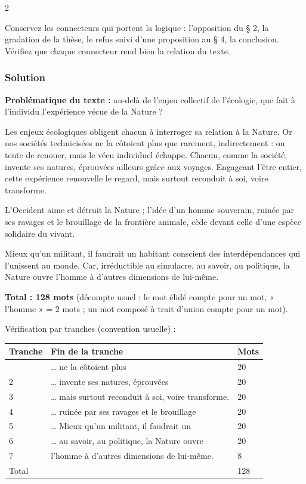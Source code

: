 \documentclass[11pt,a4paper]{article}
\begin{document}
\begin{indication}{2}

Conservez les connecteurs qui portent la logique : l'opposition du § 2, la gradation de la thèse, le refus suivi d'une proposition au § 4, la conclusion. Vérifiez que chaque connecteur rend bien la relation du texte.

\end{indication}

\hypertarget{solution-2}{%
\subsubsection{Solution}\label{solution-2}}

\textbf{Problématique du texte :} au-delà de l'enjeu collectif de l'écologie, que fait à l'individu l'expérience vécue de la Nature ?

Les enjeux écologiques obligent chacun à interroger sa relation à la Nature. Or nos sociétés technicisées ne la côtoient plus \textbar{} que rarement, indirectement : on tente de renouer, mais le vécu individuel échappe. Chacun, comme la société, invente ses natures, éprouvées \textbar{} ailleurs grâce aux voyages. Engageant l'être entier, cette expérience renouvelle le regard, mais surtout reconduit à soi, voire transforme. \textbar{}

L'Occident aime et détruit la Nature ; l'idée d'un homme souverain, ruinée par ses ravages et le brouillage \textbar{} de la frontière animale, cède devant celle d'une espèce solidaire du vivant.

Mieux qu'un militant, il faudrait un \textbar{} habitant conscient des interdépendances qui l'unissent au monde. Car, irréductible au simulacre, au savoir, au politique, la Nature ouvre \textbar{} l'homme à d'autres dimensions de lui-même.

\textbf{Total : 128 mots} (décompte usuel : le mot élidé compte pour un mot, « l'homme » = 2 mots ; un mot composé à trait d'union compte pour un mot).

Vérification par tranches (convention usuelle) :

\begin{longtable}[]{@{}lll@{}}
\toprule\noalign{}
Tranche & Fin de la tranche & Mots \\
\midrule\noalign{}
\endhead
\bottomrule\noalign{}
\endlastfoot
1 & \ldots{} ne la côtoient plus & 20 \\
2 & \ldots{} invente ses natures, éprouvées & 20 \\
3 & \ldots{} mais surtout reconduit à soi, voire transforme. & 20 \\
4 & \ldots{} ruinée par ses ravages et le brouillage & 20 \\
5 & \ldots{} Mieux qu'un militant, il faudrait un & 20 \\
6 & \ldots{} au savoir, au politique, la Nature ouvre & 20 \\
7 & l'homme à d'autres dimensions de lui-même. & 8 \\
Total & & 128 \\
\end{longtable}
\end{document}
